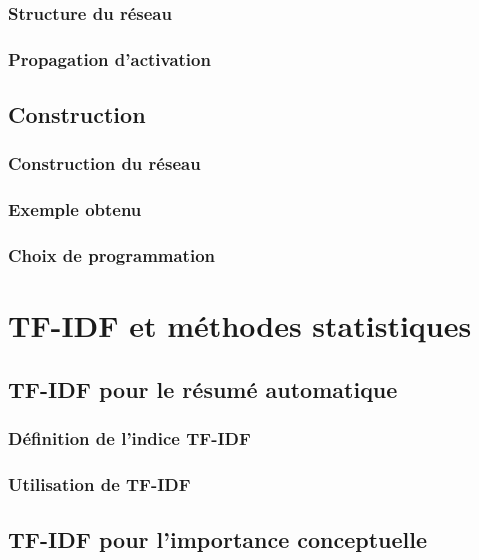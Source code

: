 \documentclass[12pt]{beamer}
\begin{document}
\begin{frame}[allowframebreaks = 0.7]
 \frametitle{Structure du réseau}
 
 
\end{frame}

\begin{frame}
 \frametitle{Propagation d'activation}
 
 
\end{frame}

\subsection{Construction}

\begin{frame}
 \frametitle{Construction du réseau}
 
 
\end{frame}

\begin{frame}
 \frametitle{Exemple obtenu}
 
 
\end{frame}


\begin{frame}
 \frametitle{Choix de programmation}
 
 
\end{frame}


\section{TF-IDF et méthodes statistiques}

\subsection{TF-IDF pour le résumé automatique}

\begin{frame}
 \frametitle{Définition de l'indice TF-IDF}
 
 
\end{frame}

\begin{frame}
 \frametitle{Utilisation de TF-IDF}
 
 
\end{frame}

\subsection{TF-IDF pour l'importance conceptuelle}
\end{document}

